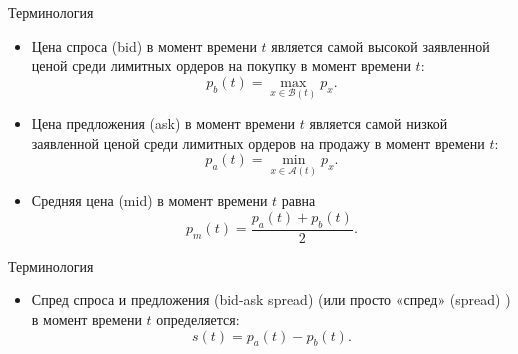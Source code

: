 \documentclass[aspectratio=169]{beamer}
\begin{document}
    \begin{frame}{Терминология}
    
        \begin{itemize}
        
            \item Цена спроса (bid) в момент времени $t$ является самой высокой заявленной ценой среди лимитных ордеров на покупку в момент времени $t$: 
            \begin{equation*}
                p_b(t) = \max\limits_{x \in \mathcal B(t)} p_x.
            \end{equation*}
    
            \item Цена предложения (ask) в момент времени $t$ является самой низкой заявленной ценой среди лимитных ордеров на продажу в момент времени $t$:
            \begin{equation*}
                p_a(t) = \min\limits_{x \in \mathcal A(t)} p_x.
            \end{equation*}
    
            \item  Средняя цена (mid) в момент времени $t$ равна
            \begin{equation*}
                p_m(t) = \frac{p_a(t) + p_b(t)}{2}.
            \end{equation*}
            
        \end{itemize} 
    \end{frame}

    \begin{frame}{Терминология}

        \begin{itemize}
        
            \item Спред спроса и предложения (bid-ask spread) (или просто «спред» (spread) ) в момент времени $t$ определяется:
            \begin{equation*}
                s(t) = p_a(t) - p_b(t).
            \end{equation*}
            
        \end{itemize}

    \end{frame}


        
\end{document}
